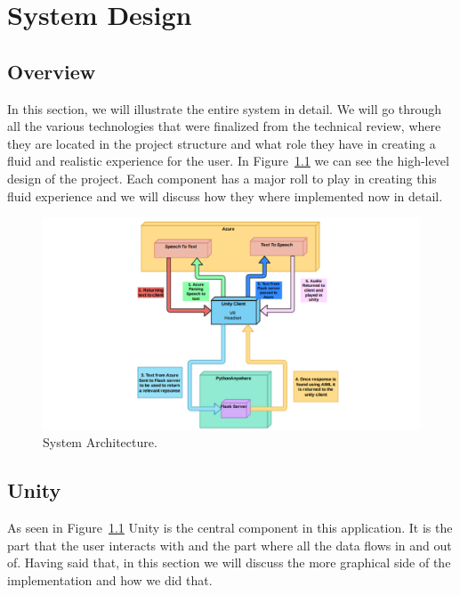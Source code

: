 \chapter{System Design}

\section{Overview}
In this section, we will illustrate the entire system in detail. We will go through all the various technologies that were finalized from the technical review, where they are located in the project structure and what role they have in creating a fluid and realistic experience for the user. In Figure~\ref{image:SystemArch} we can see the high-level design of the project. Each component has a major roll to play in creating this fluid experience and we will discuss how they where implemented now in detail.

\begin{figure}[h!]
	\caption{System Architecture.}
	\label{image:SystemArch}
	\centering
	\includegraphics[width=1\textwidth]{Images/uml2.png}
\end{figure}

\section{Unity}
As seen in Figure~\ref{image:SystemArch} Unity is the central component in this application. It is the part that the user interacts with and the part where all the data flows in and out of. Having said that, in this section we will discuss the more graphical side of the implementation and how we did that.

